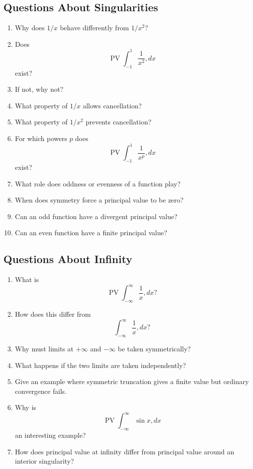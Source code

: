 \subsection{Questions About Singularities}

\begin{enumerate}[resume]
  \item Why does \(1/x\) behave differently from \(1/x^2\)?
  \item Does
    \[
      \operatorname{PV}\int_{-1}^{1}\frac{1}{x^2},dx
    \]
    exist?
  \item If not, why not?
  \item What property of \(1/x\) allows cancellation?
  \item What property of \(1/x^2\) prevents cancellation?
  \item For which powers \(p\) does
    \[
      \operatorname{PV}\int_{-1}^{1}\frac{1}{x^p},dx
    \]
    exist?
  \item What role does oddness or evenness of a function play?
  \item When does symmetry force a principal value to be zero?
  \item Can an odd function have a divergent principal value?
  \item Can an even function have a finite principal value?
\end{enumerate}

\subsection{Questions About Infinity}

\begin{enumerate}[resume]
  \item What is
    \[
      \operatorname{PV}\int_{-\infty}^{\infty}\frac{1}{x},dx?
    \]
  \item How does this differ from
    \[
      \int_{-\infty}^{\infty}\frac{1}{x},dx?
    \]
  \item Why must limits at \(+\infty\) and \(-\infty\) be taken symmetrically?
  \item What happens if the two limits are taken independently?
  \item Give an example where symmetric truncation gives a finite value but ordinary convergence fails.
  \item Why is
    \[
      \operatorname{PV}\int_{-\infty}^{\infty}\sin x,dx
    \]
    an interesting example?
  \item How does principal value at infinity differ from principal value around an interior singularity?
\end{enumerate}

